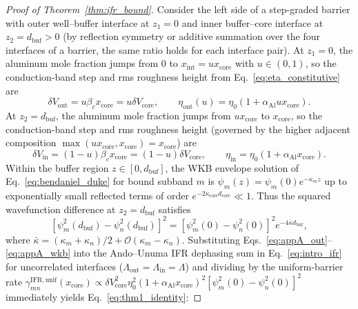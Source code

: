 \documentclass[11pt,letterpaper]{article}
\begin{document}
\begin{proof}[Proof of Theorem~\ref{thm:ifr_bound}]
Consider the left side of a step-graded barrier with outer well--buffer interface at $z_1 = 0$ and inner buffer--core interface at $z_2 = d_{\mathrm{buf}} > 0$ (by reflection symmetry or additive summation over the four interfaces of a barrier, the same ratio holds for each interface pair). At $z_1 = 0$, the aluminum mole fraction jumps from $0$ to $x_{\mathrm{int}} = u x_{\mathrm{core}}$ with $u \in (0, 1)$, so the conduction-band step and rms roughness height from Eq.~\eqref{eq:eta_constitutive} are
\begin{equation}
\delta V_{\mathrm{out}} = u \beta_c x_{\mathrm{core}} = u \delta V_{\mathrm{core}}, \qquad \eta_{\mathrm{out}}(u) = \eta_0(1 + \alpha_{\mathrm{Al}} u x_{\mathrm{core}}).
\label{eq:appA_out}
\end{equation}
At $z_2 = d_{\mathrm{buf}}$, the aluminum mole fraction jumps from $u x_{\mathrm{core}}$ to $x_{\mathrm{core}}$, so the conduction-band step and rms roughness height (governed by the higher adjacent composition $\max(u x_{\mathrm{core}}, x_{\mathrm{core}}) = x_{\mathrm{core}}$) are
\begin{equation}
\delta V_{\mathrm{in}} = (1 - u)\beta_c x_{\mathrm{core}} = (1 - u)\delta V_{\mathrm{core}}, \qquad \eta_{\mathrm{in}} = \eta_0(1 + \alpha_{\mathrm{Al}} x_{\mathrm{core}}).
\label{eq:appA_in}
\end{equation}
Within the buffer region $z \in [0, d_{\mathrm{buf}}]$, the WKB envelope solution of Eq.~\eqref{eq:bendaniel_duke} for bound subband $m$ is $\psi_m(z) = \psi_m(0)e^{-\kappa_m z}$ up to exponentially small reflected terms of order $e^{-2\kappa_{\mathrm{core}} d_{\mathrm{core}}} \ll 1$. Thus the squared wavefunction difference at $z_2 = d_{\mathrm{buf}}$ satisfies
\begin{equation}
\left[\psi_m^2(d_{\mathrm{buf}}) - \psi_n^2(d_{\mathrm{buf}})\right]^2 = \left[\psi_m^2(0) - \psi_n^2(0)\right]^2 e^{-4\bar{\kappa} d_{\mathrm{buf}}},
\label{eq:appA_wkb}
\end{equation}
where $\bar{\kappa} = (\kappa_m + \kappa_n)/2 + \mathcal{O}(\kappa_m - \kappa_n)$. Substituting Eqs.~\eqref{eq:appA_out}--\eqref{eq:appA_wkb} into the Ando--Unuma IFR dephasing sum in Eq.~\eqref{eq:intro_ifr} for uncorrelated interfaces ($\Lambda_{\mathrm{out}} = \Lambda_{\mathrm{in}} = \Lambda$) and dividing by the uniform-barrier rate $\gamma_{mn}^{\mathrm{IFR,unif}}(x_{\mathrm{core}}) \propto \delta V_{\mathrm{core}}^2 \eta_0^2(1 + \alpha_{\mathrm{Al}} x_{\mathrm{core}})^2 [\psi_m^2(0) - \psi_n^2(0)]^2$ immediately yields Eq.~\eqref{eq:thm1_identity}:

\end{proof}
\end{document}
